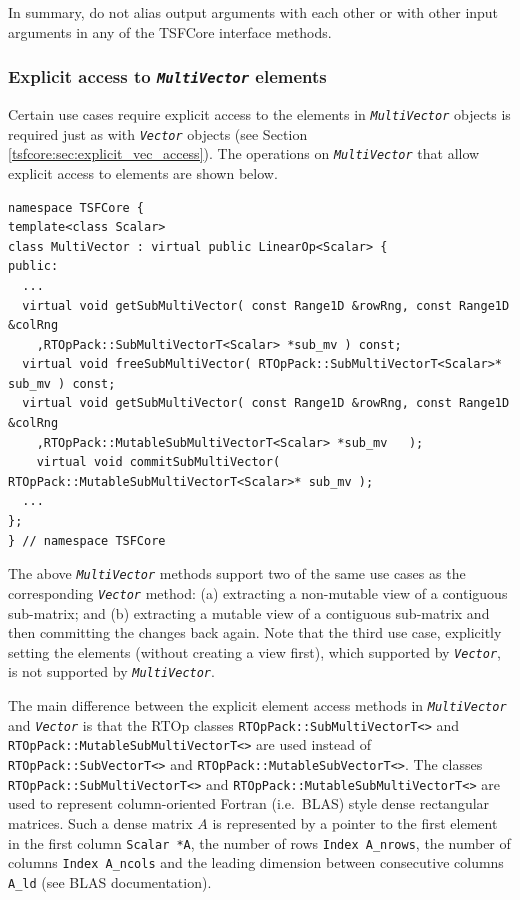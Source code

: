 In summary, do not alias output arguments with each other or with
other input arguments in any of the TSFCore interface methods.

%
\subsubsection{Explicit access to {}\texttt{\textit{Multi\-Vector}} elements}
\label{tsfcore:sec:explicit_multi_vec_access}
%

Certain use cases require explicit access to the elements in
{}\texttt{\textit{Multi\-Vector}} objects is required just as with
{}\texttt{\textit{Vector}} objects (see Section
{}\ref{tsfcore:sec:explicit_vec_access}).  The operations on
{}\texttt{\textit{Multi\-Vector}} that allow explicit access to
elements are shown below.

{\scriptsize\begin{verbatim}
namespace TSFCore {
template<class Scalar>
class MultiVector : virtual public LinearOp<Scalar> {
public:
  ...
  virtual void getSubMultiVector( const Range1D &rowRng, const Range1D &colRng
    ,RTOpPack::SubMultiVectorT<Scalar> *sub_mv ) const;
  virtual void freeSubMultiVector( RTOpPack::SubMultiVectorT<Scalar>* sub_mv ) const;
  virtual void getSubMultiVector( const Range1D &rowRng, const Range1D &colRng
    ,RTOpPack::MutableSubMultiVectorT<Scalar> *sub_mv	);
	virtual void commitSubMultiVector( RTOpPack::MutableSubMultiVectorT<Scalar>* sub_mv );
  ...
};
} // namespace TSFCore
\end{verbatim}}

The above {}\texttt{\textit{Multi\-Vector}} methods support two of the
same use cases as the corresponding {}\texttt{\textit{Vector}}
method: (a) extracting a non-mutable view of a contiguous sub-matrix;
and (b) extracting a mutable view of a contiguous sub-matrix and then
committing the changes back again.  Note that the third use case,
explicitly setting the elements (without creating a view first), which
supported by {}\texttt{\textit{Vector}}, is not supported by
{}\texttt{\textit{Multi\-Vector}}.

The main difference between the explicit element access methods in
{}\texttt{\textit{Multi\-Vector}} and {}\texttt{\textit{Vector}} is
that the RTOp classes {}\texttt{RTOpPack::\-SubMultiVectorT<>} and
{}\texttt{RTOpPack::\-MutableSubMultiVectorT<>} are used instead of
{}\texttt{RTOpPack::\-SubVectorT<>} and
{}\texttt{RTOpPack::\-MutableSubVectorT<>}.  The classes
{}\texttt{RTOpPack::\-SubMultiVectorT<>} and
{}\texttt{RTOpPack::\-MutableSubMultiVectorT<>} are used to represent
column-oriented Fortran (i.e.~BLAS) style dense rectangular matrices.
Such a dense matrix $A$ is represented by a pointer to the first
element in the first column {}\texttt{Scalar *A}, the number of rows
{}\texttt{Index A\_nrows}, the number of columns {}\texttt{Index
A\_ncols} and the leading dimension between consecutive columns
{}\texttt{A\_ld} (see BLAS documentation).

